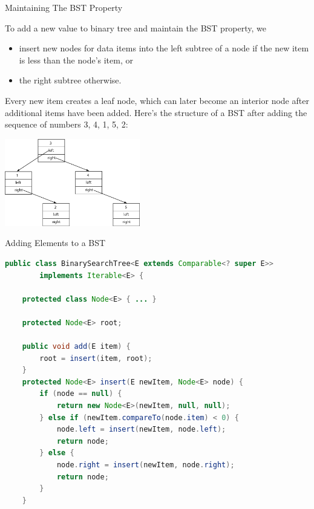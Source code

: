 \documentclass{beamer}
\begin{document}
\begin{frame}[fragile]{Maintaining The BST Property}

To add a new value to binary tree and maintain the BST property, we
\begin{itemize}
\item insert new nodes for data items into the left subtree of a node if the new item is less than the node's item, or
\item the right subtree otherwise.
\end{itemize}
Every new item creates a leaf node, which can later become an interior node after additional items have been added. Here's the structure of a BST after adding the sequence of numbers 3, 4, 1, 5, 2:
\vspace{-.05in}
\begin{center}
\includegraphics[height=1.5in]{binary-tree-nums.png}
\end{center}

\end{frame}

\begin{frame}[fragile]{Adding Elements to a BST}

\begin{lstlisting}[language=Java]
public class BinarySearchTree<E extends Comparable<? super E>>
        implements Iterable<E> {

    protected class Node<E> { ... }

    protected Node<E> root;

    public void add(E item) {
        root = insert(item, root);
    }
    protected Node<E> insert(E newItem, Node<E> node) {
        if (node == null) {
            return new Node<E>(newItem, null, null);
        } else if (newItem.compareTo(node.item) < 0) {
            node.left = insert(newItem, node.left);
            return node;
        } else {
            node.right = insert(newItem, node.right);
            return node;
        }
    }
\end{lstlisting}


\end{frame}
\end{document}
